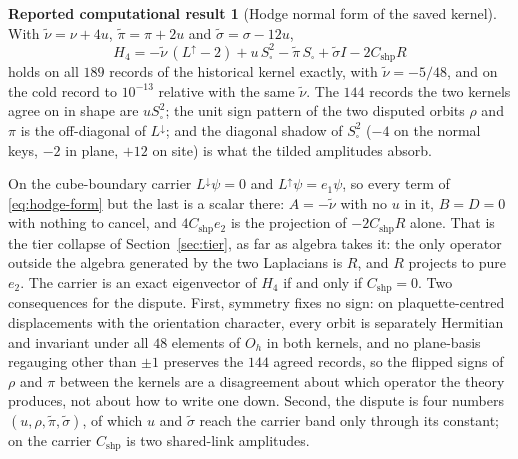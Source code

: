 \documentclass[11pt]{article}
\theoremstyle{plain}
\theoremstyle{definition}
\newtheorem{reported}[theorem]{Reported computational result}
\theoremstyle{remark}
\newcommand{\chk}[1]{}
\begin{document}
\begin{reported}[Hodge normal form of the saved kernel]\label{rep:hodge-form}
With $\tilde\nu=\nu+4u$, $\tilde\pi=\pi+2u$ and $\tilde\sigma=\sigma-12u$,
\begin{equation}\label{eq:hodge-form}
 H_4=-\tilde\nu\,(L^\uparrow-2)+u\,S_\square^2-\tilde\pi\,S_\square
 +\tilde\sigma I-2C_{\mathrm{shp}}R
\end{equation}
holds on all $189$ records of the historical kernel exactly, with
$\tilde\nu=-5/48$, and on the cold record to $10^{-13}$ relative with the same
$\tilde\nu$. The $144$ records the two kernels agree on in shape are
$uS_\square^2$; the unit sign pattern of the two disputed orbits $\rho$ and
$\pi$ is the off-diagonal of $L^\downarrow$; and the diagonal shadow of
$S_\square^2$ ($-4$ on the normal keys, $-2$ in plane, $+12$ on site) is what
the tilded amplitudes absorb.
\end{reported}
\chk{the 144 agreed records are u S\_sq\^{}2, the shared-link adjacency squared}
\chk{H4 = -nu~(L\_up - 2) + u S\_sq\^{}2 - pi~ S\_sq + sigma~ - 2 C\_shp R exactly: C\_shp is the coefficient of the one non-Hodge operator}
\chk{FINDING: the cold kernel has the same Hodge form, with nu~ = -5/48 and its own (u, rho, pi~, sigma~)}

On the cube-boundary carrier $L^\downarrow\psi=0$ and $L^\uparrow\psi=e_1\psi$,
so every term of \eqref{eq:hodge-form} but the last is a scalar there:
$A=-\tilde\nu$ with no $u$ in it, $B=D=0$ with nothing to cancel, and
$4C_{\mathrm{shp}}e_2$ is the projection of $-2C_{\mathrm{shp}}R$ alone. That
is the tier collapse of Section~\ref{sec:tier}, as far as algebra takes it:
the only operator outside the algebra generated by the two Laplacians is $R$,
and $R$ projects to pure $e_2$. The carrier is an exact eigenvector of $H_4$
if and only if $C_{\mathrm{shp}}=0$. Two consequences for the dispute. First,
symmetry fixes no sign: on plaquette-centred displacements with the
orientation character, every orbit is separately Hermitian and invariant under
all $48$ elements of $O_h$ in both kernels, and no plane-basis regauging other
than $\pm1$ preserves the $144$ agreed records, so the flipped signs of $\rho$
and $\pi$ between the kernels are a disagreement about which operator the
theory produces, not about how to write one down. Second, the dispute is four
numbers $(u,\rho,\tilde\pi,\tilde\sigma)$, of which $u$ and $\tilde\sigma$
reach the carrier band only through its constant; on the carrier
$C_{\mathrm{shp}}$ is two shared-link amplitudes.
\chk{every orbit is separately Hermitian and cubic-covariant, so symmetry fixes no sign}
\chk{no plane-basis convention flips rho or pi: only +-1 keeps the 144 agreed records}
\chk{FINDING: the cold kernel carries the same orientation character, so its flips are real}
\chk{the tier collapse is one identity: D = -6u + 3*u2 with u2 = 2u}
\chk{u2 = 2u is the cross term of a perfect square}
\end{document}
